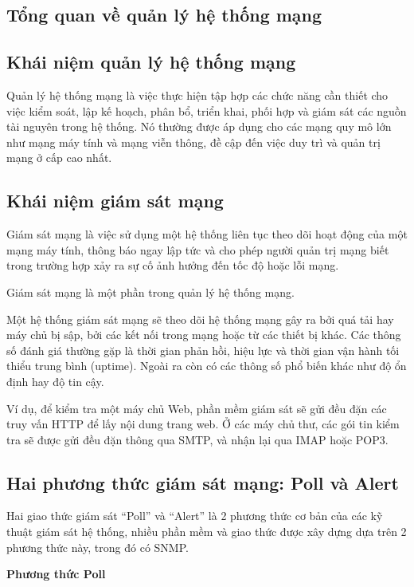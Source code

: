 \documentclass[12pt,oneside,a4paper,reqno]{report}
\begin{document}
\begin{large}
\section{Tổng quan về quản lý hệ thống mạng}
\subsection{Khái niệm quản lý hệ thống mạng}
Quản lý hệ thống mạng là việc thực hiện tập hợp các chức năng cần thiết cho việc kiểm soát, lập kế hoạch, phân bổ, triển khai, phối hợp và giám sát các nguồn tài nguyên trong hệ thống. Nó thường được áp dụng cho các mạng quy mô lớn như mạng máy tính và mạng viễn thông, đề cập đến việc duy trì và quản trị mạng ở cấp cao nhất.
\subsection{Khái niệm giám sát mạng}
Giám sát mạng là việc sử dụng một hệ thống liên tục theo dõi hoạt động của một mạng máy tính, thông báo ngay lập tức và cho phép người quản trị mạng biết trong trường hợp xảy ra sự cố ảnh hưởng đến tốc độ hoặc lỗi mạng.

Giám sát mạng là một phần trong quản lý hệ thống mạng.

Một hệ thống giám sát mạng sẽ theo dõi hệ thống mạng gây ra bởi quá tải hay máy chủ bị sập, bởi các kết nối trong mạng hoặc từ các thiết bị khác. Các thông số đánh giá thường gặp là thời gian phản hồi, hiệu lực và thời gian vận hành tối thiểu trung bình (uptime). Ngoài ra còn có các thông số phổ biến khác như độ ổn định hay độ tin cậy.

Ví dụ, để kiểm tra một máy chủ Web, phần mềm giám sát sẽ gửi đều đặn các truy vấn HTTP để lấy nội dung trang web. Ở các máy chủ thư, các gói tin kiểm tra sẽ được gửi đều đặn thông qua SMTP, và nhận lại qua IMAP hoặc POP3.
\subsection{Hai phương thức giám sát mạng: Poll và Alert}
Hai giao thức giám sát “Poll” và “Alert” là 2 phương thức cơ bản của các kỹ thuật giám sát hệ thống, nhiều phần mềm và giao thức được xây dựng dựa trên 2 phương thức này, trong đó có SNMP.

\textbf{Phương thức Poll}


\end{large}
\end{document}
